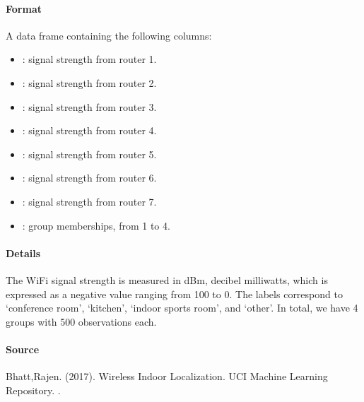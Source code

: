 \documentclass[letterpaper,10pt,english,openany,oneside]{sphinxmanual}
\begin{document}
\paragraph{Format}
\label{\detokenize{user_guide/datasets:format}}
\sphinxAtStartPar
A data frame containing the following columns:
\begin{itemize}
\item {} 
\sphinxAtStartPar
{}: signal strength from router 1.

\item {} 
\sphinxAtStartPar
{}: signal strength from router 2.

\item {} 
\sphinxAtStartPar
{}: signal strength from router 3.

\item {} 
\sphinxAtStartPar
{}: signal strength from router 4.

\item {} 
\sphinxAtStartPar
{}: signal strength from router 5.

\item {} 
\sphinxAtStartPar
{}: signal strength from router 6.

\item {} 
\sphinxAtStartPar
{}: signal strength from router 7.

\item {} 
\sphinxAtStartPar
{}: group memberships, from 1 to 4.

\end{itemize}


\paragraph{Details}
\label{\detokenize{user_guide/datasets:details}}
\sphinxAtStartPar
The Wi\sphinxhyphen{}Fi signal strength is measured in dBm, decibel milliwatts, which is expressed
as a negative value ranging from \sphinxhyphen{}100 to 0. The labels correspond to ‘conference room’,
‘kitchen’, ‘indoor sports room’, and ‘other’. In total, we have 4 groups with 500 observations each.


\paragraph{Source}
\label{\detokenize{user_guide/datasets:source}}
\sphinxAtStartPar
Bhatt,Rajen. (2017). Wireless Indoor Localization. UCI Machine Learning Repository. .
\end{document}
